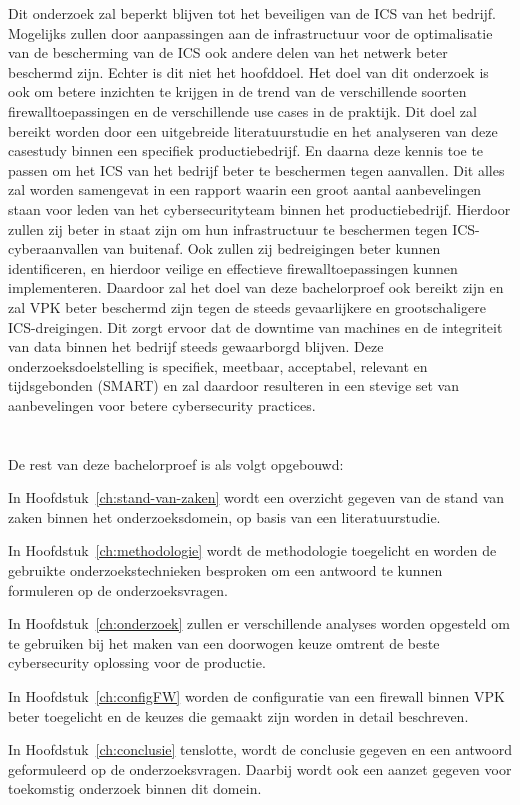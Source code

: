 Dit onderzoek zal beperkt blijven tot het beveiligen van de ICS van het bedrijf. Mogelijks zullen door aanpassingen aan de infrastructuur voor de optimalisatie van de bescherming van de ICS ook andere delen van het netwerk beter beschermd zijn. Echter is dit niet het hoofddoel. Het doel van dit onderzoek is ook om betere inzichten te krijgen in de trend van de verschillende soorten firewalltoepassingen en de verschillende use cases in de praktijk. Dit doel zal bereikt worden door een uitgebreide literatuurstudie en het analyseren van deze casestudy binnen een specifiek productiebedrijf. En daarna deze kennis toe te passen om het ICS van het bedrijf beter te beschermen tegen aanvallen. Dit alles zal worden samengevat in een rapport waarin een groot aantal aanbevelingen staan voor leden van het cybersecurityteam binnen het productiebedrijf. Hierdoor zullen zij beter in staat zijn om hun infrastructuur te beschermen tegen ICS-cyberaanvallen van buitenaf. Ook zullen zij bedreigingen beter kunnen identificeren, en hierdoor veilige en effectieve firewalltoepassingen kunnen implementeren. Daardoor zal het doel van deze bachelorproef ook bereikt zijn en zal VPK beter beschermd zijn tegen de steeds gevaarlijkere en grootschaligere ICS-dreigingen. Dit zorgt ervoor dat de downtime van machines en de integriteit van data binnen het bedrijf steeds gewaarborgd blijven. Deze onderzoeksdoelstelling is specifiek, meetbaar, acceptabel, relevant en tijdsgebonden (SMART) en zal daardoor resulteren in een stevige set van aanbevelingen voor betere cybersecurity practices.

\section{}%
\label{sec:opzet-bachelorproef}


De rest van deze bachelorproef is als volgt opgebouwd:

In Hoofdstuk~\ref{ch:stand-van-zaken} wordt een overzicht gegeven van de stand van zaken binnen het onderzoeksdomein, op basis van een literatuurstudie.

In Hoofdstuk~\ref{ch:methodologie} wordt de methodologie toegelicht en worden de gebruikte onderzoekstechnieken besproken om een antwoord te kunnen formuleren op de onderzoeksvragen.

In Hoofdstuk~\ref{ch:onderzoek} zullen er verschillende analyses worden opgesteld om te gebruiken bij het maken van een doorwogen keuze omtrent de beste cybersecurity oplossing voor de productie.

In Hoofdstuk~\ref{ch:configFW} worden de configuratie van een firewall binnen VPK beter toegelicht en de keuzes die gemaakt zijn worden in detail beschreven.

In Hoofdstuk~\ref{ch:conclusie} tenslotte, wordt de conclusie gegeven en een antwoord geformuleerd op de onderzoeksvragen. Daarbij wordt ook een aanzet gegeven voor toekomstig onderzoek binnen dit domein.